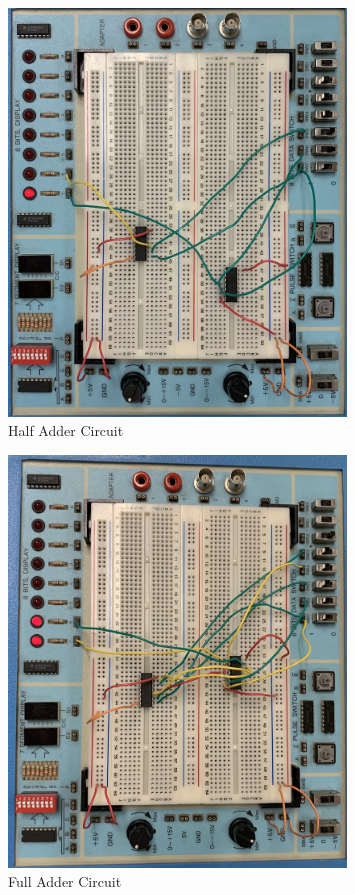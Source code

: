 \documentclass[11pt]{article}
\begin{document}
\begin{figure}\centering
	\includegraphics[width=0.8\textwidth,trim=0cm 0cm 0cm 0cm,clip]{Half_Adder}
	\caption{Half Adder Circuit}
	\label{fig:Half_Adder}	
\end{figure}

\begin{figure}\centering
	\includegraphics[width=0.8\textwidth,trim=0cm 0cm 0cm 0cm,clip]{Full_Adder}
	\caption{Full Adder Circuit}
	\label{fig:Full_Adder}	
\end{figure}
\end{document}
